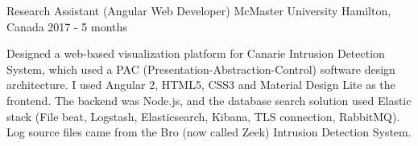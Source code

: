 \begin{cventries}
  \cventry
{Research Assistant (Angular Web Developer)} %
{McMaster University} %
{Hamilton, Canada} %
{2017 - 5 months} %
{\vspace{1.0mm}
	\begin{cvitems}
		\item
		{Designed a web-based visualization platform for Canarie Intrusion Detection System, which used a PAC (Presentation-Abstraction-Control) software design architecture. I used Angular 2, HTML5, CSS3 and Material Design Lite as the frontend. The backend was Node.js, and the database search solution used Elastic stack (File beat, Logstash, Elasticsearch, Kibana, TLS connection, RabbitMQ). Log source files came from the Bro (now called Zeek) Intrusion Detection System.}
	\end{cvitems}
}


\end{cventries}
